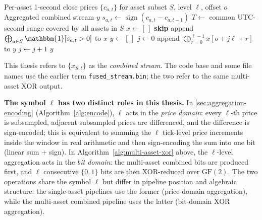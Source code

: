 \documentclass[11pt,titlepage,openany,oneside]{book}  %
\begin{document}
\begin{algorithm}
  \caption{Multi-asset XOR combination and $\ell$-level aggregation}
  \label{alg:multi-asset-xor}
  \begin{algorithmic}[1]
    \Require Per-asset 1-second close prices $\{c_{a,t}\}$ for asset subset $S$, level $\ell$, offset $o$
    \Ensure Aggregated combined stream $y$
    \Statex {}
        \State $s_{a,t} \gets \operatorname{sign}(c_{a,t} - c_{a,t-1})$ 
      \EndFor
    \EndFor
    \Statex {}
    \State $T \gets$ common UTC-second range covered by all assets in $S$
    \State $x \gets [\,]$
        \State \textbf{skip}
      \Else
        \State append $\bigoplus_{a \in S} \mathbbm{1}[s_{a,t} > 0]$ to $x$
      \EndIf
    \EndFor
    \Statex {}
    \State $y \gets [\,]$
    \State $j \gets 0$
      \State append $\bigoplus_{r=0}^{\ell - 1} x[o + j\ell + r]$ to $y$
      \State $j \gets j + 1$
    \EndWhile
    \State \Return $y$
  \end{algorithmic}
\end{algorithm}

This thesis refers to $\{x_{S,t}\}$ as the \emph{combined stream}. The code base and some file names use the earlier term \texttt{fused\_stream.bin}; the two refer to the same multi-asset XOR output.

\textbf{The symbol $\boldsymbol{\ell}$ has two distinct roles in this thesis.} In \cref{sec:aggregation-encoding} (Algorithm~\ref{alg:encode}), $\ell$ acts in the \emph{price domain}: every $\ell$-th price is subsampled, adjacent subsampled prices are differenced, and the difference is sign-encoded; this is equivalent to summing the $\ell$ tick-level price increments inside the window in real arithmetic and then sign-encoding the sum into one bit (linear sum + sign). In Algorithm~\ref{alg:multi-asset-xor} above, the $\ell$-level aggregation acts in the \emph{bit domain}: the multi-asset combined bits are produced first, and $\ell$ consecutive $\{0,1\}$ bits are then XOR-reduced over $\mathrm{GF}(2)$. The two operations share the symbol $\ell$ but differ in pipeline position and algebraic structure: the single-asset pipelines use the former (price-domain aggregation), while the multi-asset combined pipeline uses the latter (bit-domain XOR aggregation).
\end{document}
